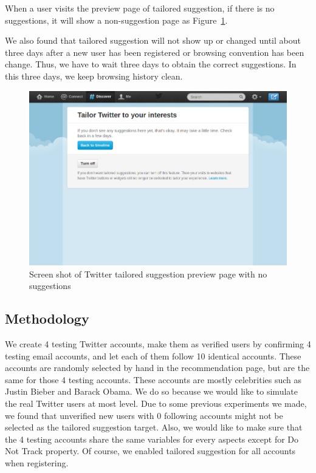 \documentclass{sig-alternate}
\begin{document}
When a user visits the preview page of tailored suggestion, if there is no suggestions, it will show a non-suggestion page as Figure~\ref{fig:nosug}.

We also found that tailored suggestion will not show up or changed until about three days after a new user has been registered or browsing convention has been change. Thus, we have to wait three days to obtain the correct suggestions. In this three days, we keep browsing history clean.

\begin{figure}
\begin{center}
\includegraphics[width=0.9\columnwidth]{nosug}
\end{center}
\caption{Screen shot of Twitter tailored suggestion preview page with no suggestions}
\label{fig:nosug}
\end{figure}

\subsection{Methodology} \label{sec:method}

We create 4 testing Twitter accounts, make them as verified users by confirming 4 testing email accounts, and let each of them follow 10 identical accounts. These accounts are randomly selected by hand in the recommendation page, but are the same for those 4 testing accounts. These accounts are mostly celebrities such as Justin Bieber and Barack Obama. We do so because we would like to simulate the real Twitter users at most level. Due to some previous experiments we made, we found that unverified new users with 0 following accounts might not be selected as the tailored suggestion target. Also, we would like to make sure that the 4 testing accounts share the same variables for every aspects except for Do Not Track property. Of course, we enabled tailored suggestion for all accounts when registering.
\end{document}
